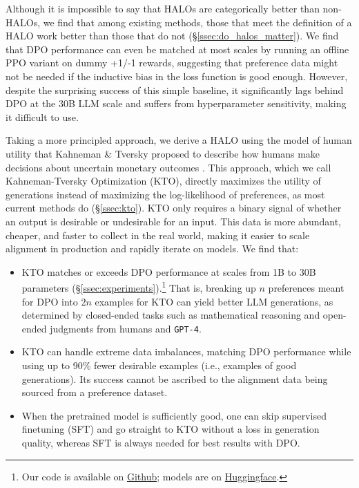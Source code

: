 Although it is impossible to say that HALOs are categorically better than non-HALOs, we find that among existing methods, those that meet the definition of a HALO work better than those that do not (\S\ref{ssec:do_halos_matter}).
We find that DPO performance can even be matched at most scales by running an offline PPO variant on dummy +1/-1 rewards, suggesting that preference data might not be needed if the inductive bias in the loss function is good enough.
However, despite the surprising success of this simple baseline, it significantly lags behind DPO at the 30B LLM scale and suffers from hyperparameter sensitivity, making it difficult to use.

Taking a more principled approach, we derive a HALO using the model of human utility that Kahneman \& Tversky proposed to describe how humans make decisions about uncertain monetary outcomes \citep{tversky1992advances}.
This approach, which we call Kahneman-Tversky Optimization (KTO), directly maximizes the utility of generations instead of maximizing the log-likelihood of preferences, as most current methods do (\S\ref{ssec:kto}).
KTO only requires a binary signal of whether an output is desirable or undesirable for an input.
This data is more abundant, cheaper, and faster to collect in the real world,  making it easier to scale alignment in production and rapidly iterate on models.
We find that:
\begin{itemize}
    \item KTO matches or exceeds DPO performance at  scales from 1B to 30B parameters (\S\ref{ssec:experiments}).\footnote{Our code is available on \href{https://github.com/ContextualAI/HALOs}{Github}; models are on \href{https://huggingface.co/collections/ContextualAI/archangel-65bd45029fa020161b052430}{Huggingface}.}
    That is, breaking up $n$ preferences meant for DPO into $2n$ examples for KTO can yield better LLM generations, as determined by closed-ended tasks such as mathematical reasoning and open-ended judgments from humans and \texttt{GPT-4}. 
    
    \item KTO can handle extreme data imbalances, matching DPO performance while using up to 90\% fewer desirable examples (i.e., examples of good generations).
    Its success cannot be ascribed to the alignment data being sourced from a preference dataset.

    \item When the pretrained model is sufficiently good, one can skip supervised finetuning (SFT) and go straight to KTO without a loss in generation quality, whereas SFT is always needed for best results with DPO.
\end{itemize}
